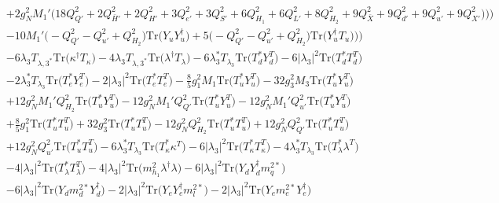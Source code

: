 {\begin{align}
 &+2 g_{N}^{2} M_1' \Big(18 Q_{Q'}^{2}  + 2 Q_{\bar{H}'}^{2}  + 2 Q_{H'}^{2}  + 3 Q_{e'}^{2}  + 3 Q_{S'}^{2}  + 6 Q_{H_1}^{2}  + 6 Q_{L'}^{2}  + 8 Q_{H_2}^{2}  + 9 Q_{\bar{X}}^{2}  + 9 Q_{d'}^{2}  + 9 Q_{u'}^{2}  + 9 Q_{X'}^{2} \Big)\Big)\Big)\nonumber \\ 
 &-10 M_1' \Big(- Q_{Q'}^{2}  - Q_{u'}^{2}  + Q_{H_2}^{2}\Big)\mbox{Tr}\Big({Y_u  Y_{u}^{\dagger}}\Big) +5 \Big(- Q_{Q'}^{2}  - Q_{u'}^{2}  + Q_{H_2}^{2}\Big)\mbox{Tr}\Big({Y_{u}^{\dagger}  T_u}\Big) \Big)\Big)\nonumber \\ 
 &-6 \lambda_3 T_{{\lambda,3}^*} \mbox{Tr}\Big({\kappa^{\dagger}  T_{\kappa}}\Big) -4 \lambda_3 T_{{\lambda,3}^*} \mbox{Tr}\Big({\lambda^{\dagger}  T_{\lambda}}\Big) -6 \lambda_3^* T_{\lambda_3} \mbox{Tr}\Big({T_d^*  Y_{d}^{T}}\Big) -6 |\lambda_3|^2 \mbox{Tr}\Big({T_d^*  T_{d}^{T}}\Big) \nonumber \\ 
 &-2 \lambda_3^* T_{\lambda_3} \mbox{Tr}\Big({T_e^*  Y_{e}^{T}}\Big) -2 |\lambda_3|^2 \mbox{Tr}\Big({T_e^*  T_{e}^{T}}\Big) -\frac{8}{5} g_{1}^{2} M_1 \mbox{Tr}\Big({T_u^*  Y_{u}^{T}}\Big) -32 g_{3}^{2} M_3 \mbox{Tr}\Big({T_u^*  Y_{u}^{T}}\Big) \nonumber \\ 
 &+12 g_{N}^{2} M_1' Q_{H_2}^{2} \mbox{Tr}\Big({T_u^*  Y_{u}^{T}}\Big) -12 g_{N}^{2} M_1' Q_{Q'}^{2} \mbox{Tr}\Big({T_u^*  Y_{u}^{T}}\Big) -12 g_{N}^{2} M_1' Q_{u'}^{2} \mbox{Tr}\Big({T_u^*  Y_{u}^{T}}\Big) \nonumber \\ 
 &+\frac{8}{5} g_{1}^{2} \mbox{Tr}\Big({T_u^*  T_{u}^{T}}\Big) +32 g_{3}^{2} \mbox{Tr}\Big({T_u^*  T_{u}^{T}}\Big) -12 g_{N}^{2} Q_{H_2}^{2} \mbox{Tr}\Big({T_u^*  T_{u}^{T}}\Big) +12 g_{N}^{2} Q_{Q'}^{2} \mbox{Tr}\Big({T_u^*  T_{u}^{T}}\Big) \nonumber \\ 
 &+12 g_{N}^{2} Q_{u'}^{2} \mbox{Tr}\Big({T_u^*  T_{u}^{T}}\Big) -6 \lambda_3^* T_{\lambda_3} \mbox{Tr}\Big({T_{\kappa}^*  \kappa^{T}}\Big) -6 |\lambda_3|^2 \mbox{Tr}\Big({T_{\kappa}^*  T_{\kappa}^{T}}\Big) -4 \lambda_3^* T_{\lambda_3} \mbox{Tr}\Big({T_{\lambda}^*  \lambda^{T}}\Big) \nonumber \\ 
 &-4 |\lambda_3|^2 \mbox{Tr}\Big({T_{\lambda}^*  T_{\lambda}^{T}}\Big) -4 |\lambda_3|^2 \mbox{Tr}\Big({m_{h_1}^2  \lambda^{\dagger}  \lambda}\Big) -6 |\lambda_3|^2 \mbox{Tr}\Big({Y_d  Y_{d}^{\dagger}  m_q^{2 *}}\Big) \nonumber \\ 
 &-6 |\lambda_3|^2 \mbox{Tr}\Big({Y_d  m_d^{2 *}  Y_{d}^{\dagger}}\Big) -2 |\lambda_3|^2 \mbox{Tr}\Big({Y_e  Y_{e}^{\dagger}  m_l^{2 *}}\Big) -2 |\lambda_3|^2 \mbox{Tr}\Big({Y_e  m_e^{2 *}  Y_{e}^{\dagger}}\Big) \nonumber \\ 

\end{align}}
